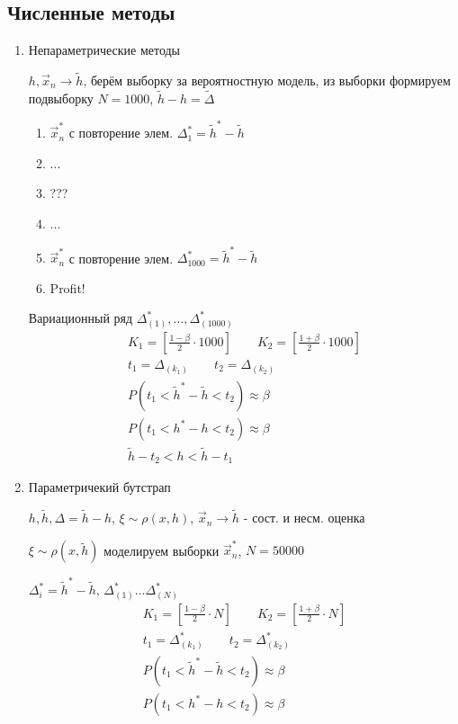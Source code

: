\documentclass{article}
\begin{document}
\subsection{Численные методы}
\begin{enumerate}
  \item Непараметрические методы

    $h, \vec{x}_n \rightarrow \tilde{h}$, берём выборку за вероятностную модель,
    из выборки формируем подвыборку $N=1000$, $\tilde{h}-h=\tilde{\Delta}$
    \begin{enumerate}
      \item $\vec{x}_n^{*}$ с повторение элем. $\Delta^{*}_1=\tilde{h}^{*}-\tilde{h}$
      \item ...
      \item ???
      \item ...
      \item $\vec{x}_n^{*}$ с повторение элем. $\Delta^{*}_{1000}=\tilde{h}^{*}-\tilde{h}$
      \item Profit!
    \end{enumerate}
    Вариационный ряд $\Delta^{*}_{(1)},\dots ,\Delta^{*}_{(1000)}$
    \begin{gather*}
      K_1=\left[\frac{1-\beta}{2}\cdot 10 0 0\right] \qquad K_2=\left[\frac{1+\beta}{2}\cdot 10 0 0\right] \\ 
      t_1=\Delta_{(k_1)} \qquad t_2=\Delta_{(k_2)} \\ 
      P(t_1< \tilde{h}^{*}-\tilde{h}<t_2) \approx \beta \\ 
      P(t_1< {h}^{*}-{h}<t_2) \approx \beta \\ 
      \tilde{h}-t_2 < h < \tilde{h} - t_1
    \end{gather*}
  \item Параметричекий бутстрап

    $h, \tilde{h}, \Delta=\tilde{h}-h$, $\xi \sim \rho(x,h)$, $\vec{x}_n \to \tilde{h}$ - сост. и несм. оценка

    $\xi \sim \rho(x, \tilde{h})$ моделируем выборки $\vec{x}_n^{*}$, $N=50000$

    $\Delta^{*}_i=\tilde{h}^{*}-\tilde{h}$, $\Delta_{(1)}^{*}\dots \Delta_{(N)}^{*}$
    \begin{gather*}
      K_1=\left[\frac{1-\beta}{2}\cdot N\right] \qquad K_2=\left[\frac{1+\beta}{2}\cdot N \right] \\ 
      t_1=\Delta_{(k_1)}^{*} \qquad t_2=\Delta_{(k_2)}^{*} \\ 
      P(t_1< \tilde{h}^{*}-\tilde{h}<t_2) \approx \beta \\ 
      P(t_1< {h}^{*}-{h}<t_2) \approx \beta
    \end{gather*}
\end{enumerate}
\end{document}
